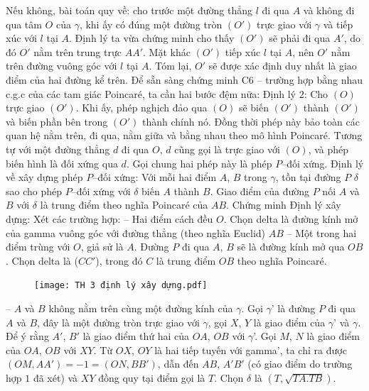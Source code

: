 \begin{multicols}{2}
	\vskip 0.1cm
	Nếu không, bài toán quy về: cho trước một đường thẳng $l$ đi qua $A$ và không đi qua tâm $O$ của $\gamma$, khi ấy có đúng một đường tròn $(O')$ trực giao với $\gamma$ và tiếp xúc với $l$ tại $A$. 
	\vskip 0.1cm
	Định lý ta vừa chứng minh cho thấy $(O')$ sẽ phải đi qua $A'$, do đó $O'$ nằm trên trung trực $AA'$. Mặt khác $(O')$ tiếp xúc $l$ tại $A$, nên $O'$ nằm trên đường vuông góc với $l$ tại $A$. Tóm lại, $O'$ sẽ được xác định duy nhất là giao điểm của hai đường kể trên.
	\vskip 0.1cm
	Để sẵn sàng chứng minh C$6$ -- trường hợp bằng nhau c.g.c của các tam giác Poincaré, ta cần hai bước đệm nữa:
	\vskip 0.1cm
	Định lý $2$: Cho $(O)$ trực giao $(O')$. Khi ấy, phép nghịch đảo qua $(O)$ sẽ biến $(O')$ thành $(O')$ và biến phần bên trong $(O')$ thành chính nó. Đồng thời phép này bảo toàn các quan hệ nằm trên, đi qua, nằm giữa và bằng nhau theo mô hình Poincaré. Tương tự với một đường thẳng $d$ đi qua $O$, $d$ cũng gọi là trực giao với $(O)$, và phép biến hình là đối xứng qua $d$. Gọi chung hai phép này là phép $P$--đối xứng.
	\vskip 0.1cm
	Định lý về xây dựng phép $P$--đối xứng: Với mỗi hai điểm $A$, $B$ trong $\gamma$, tồn tại đường $P$ $\delta$ sao cho phép $P$--đối xứng với $\delta$ biến $A$ thành $B$. Giao điểm của đường $P$ nối $A$ và $B$ với $\delta$ là trung điểm theo nghĩa Poincaré của $AB$.
	\vskip 0.1cm
	Chứng minh Định lý xây dựng: Xét các trường hợp:
	\vskip 0.1cm
	-- Hai điểm cách đều $O$. Chọn delta là đường kính mở của gamma vuông góc với đường thẳng (theo nghĩa Euclid) $AB$
	\vskip 0.1cm
	-- Một trong hai điểm trùng với $O$, giả sử là $A$. Đường $P$ đi qua $A$, $B$ sẽ là đường kính mở qua $OB$. Chọn delta là ($CC'$), trong đó $C$ là trung điểm $OB$ theo nghĩa Poincaré. 
	\begin{figure}[H]
		\vspace*{-5pt}
		\centering
		\captionsetup{labelformat= empty, justification=centering}
		\texttt{[image: TH 3 định lý xây dựng.pdf]}
		\vspace*{-10pt}
	\end{figure}
	-- $A$ và $B$ không nằm trên cùng một đường kính của $\gamma$. Gọi $\gamma$' là đường $P$ đi qua $A$ và $B$, đây là một đường tròn trực giao với $\gamma$, gọi $X$, $Y$ là giao điểm của $\gamma$' và $\gamma$. Để ý rằng $A'$, $B'$ là giao điểm thứ hai của $OA$, $OB$ với $\gamma$'. Gọi $M$, $N$ là giao điểm của $OA$, $OB$ với $XY$. Từ $OX$, $OY$ là hai tiếp tuyến với gamma', ta chỉ ra được $(OM, AA') = -1 = (ON, BB')$, dẫn đến $AB$, $A'B'$ (có giao điểm do trường hợp $1$ đã xét) và $XY$ đồng quy tại điểm gọi là $T$. Chọn $\delta$ là $(T, \sqrt{TA.TB})$. 

\end{multicols}
